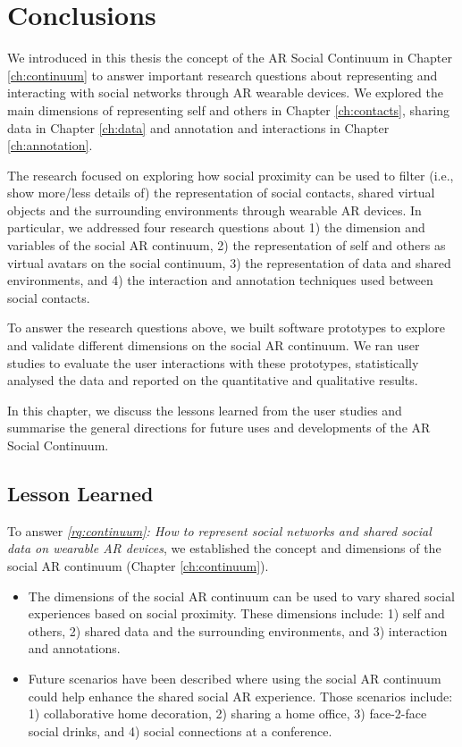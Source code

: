 \chapter{Conclusions}
\label{ch:conclusions}

We introduced in this thesis the concept of the AR Social Continuum in Chapter \ref{ch:continuum} to answer important research questions about representing and interacting with social networks through AR wearable devices. We explored the main dimensions of representing self and others in Chapter \ref{ch:contacts}, sharing data in Chapter \ref{ch:data} and annotation and interactions in Chapter \ref{ch:annotation}. 

The research focused on exploring how social proximity can be used to filter (i.e., show more/less details of) the representation of social contacts, shared virtual objects and the surrounding environments through wearable AR devices. In particular, we addressed four research questions about 1) the dimension and variables of the social AR continuum, 2) the representation of self and others as virtual avatars on the social continuum, 3) the representation of data and shared environments, and 4) the interaction and annotation techniques used between social contacts.   

To answer the research questions above, we built software prototypes to explore and validate different dimensions on the social AR continuum. We ran user studies to evaluate the user interactions with these prototypes, statistically analysed the data and reported on the quantitative and qualitative results. 

In this chapter, we discuss the lessons learned from the user studies and summarise the general directions for future uses and developments of the AR Social Continuum. 

\pagebreak

\section{Lesson Learned}
To answer \textit{\ref{rq:continuum}: How to represent social networks and shared social data on wearable AR devices}, we established the concept and dimensions of the social AR continuum (Chapter \ref{ch:continuum}).

\begin{itemize}
    \item{The dimensions of the social AR continuum can be used to vary shared social experiences based on social proximity. These dimensions include: 1) self and others, 2) shared data and the surrounding environments, and 3) interaction and annotations.}
    \item{Future scenarios have been described where using the social AR continuum could help enhance the shared social AR experience. Those scenarios include: 1) collaborative home decoration, 2) sharing a home office, 3) face-2-face social drinks, and 4) social connections at a conference.}
\end{itemize}

